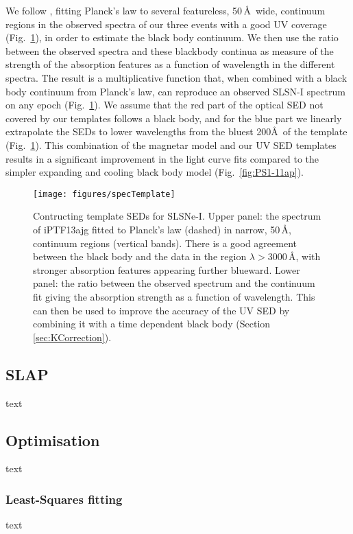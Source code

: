 We follow \cite{2014ApJ...797...24V}, fitting Planck's law to several
featureless, 50\,\AA\ wide, continuum regions in the observed spectra
of our three events with a good UV coverage
(Fig.~\ref{fig:specTemplate}), in order to estimate the black body
continuum. We then use the ratio between the observed spectra and
these blackbody continua as measure of the strength of the absorption
features as a function of wavelength in the different spectra. The
result is a multiplicative function that, when combined with a black
body continuum from Planck's law, can reproduce an observed SLSN-I
spectrum on any epoch (Fig.~\ref{fig:specTemplate}). We assume
that the red part of the optical SED not covered by our templates
follows a black body, and for the blue part we linearly extrapolate the
SEDs to lower wavelengths from the bluest 200\AA~of the template (Fig.~\ref{fig:specTemplate}).
This combination of the magnetar model and our UV SED templates
results in a significant improvement in the light curve fits
compared to the simpler expanding and cooling black body model
(Fig.~\ref{fig:PS1-11ap}).


\begin{figure}
\texttt{[image: figures/specTemplate]}
\caption{Contructing template SEDs for SLSNe-I. Upper panel: the
  spectrum of iPTF13ajg \citep[solid;][]{2014ApJ...797...24V} fitted to
  Planck's law (dashed) in narrow, 50\,\AA, continuum regions (vertical
  bands).  There is a good agreement between the black body and
  the data in the region $\lambda>3000$\,\AA, with stronger absorption
  features appearing further blueward. Lower panel: the ratio between
  the observed spectrum and the continuum fit giving the absorption
  strength as a function of wavelength. This can then be used to
  improve the accuracy of the UV SED by combining it with a time
  dependent black body (Section \ref{sec:KCorrection}).}
\label{fig:specTemplate}
\end{figure}

\subsection{SLAP}
text
\subsection{Optimisation}
text
\subsubsection{Least-Squares fitting}
text
